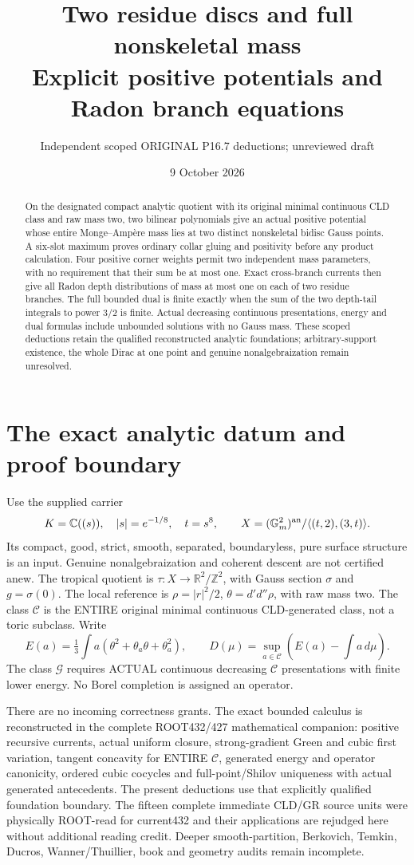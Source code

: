 \documentclass[11pt]{article}
\title{Two residue discs and full nonskeletal mass\\
Explicit positive potentials and Radon branch equations}
\author{Independent scoped ORIGINAL P16.7 deductions; unreviewed draft}
\date{9 October 2026}
\newcommand{\DD}{d'd''}
\newcommand{\C}{\mathcal C}
\newcommand{\G}{\mathcal G}
\begin{document}
\maketitle
\begin{abstract}
On the designated compact analytic quotient with its original minimal
continuous CLD class and raw mass two, two bilinear polynomials give an
actual positive potential whose entire Monge--Amp\`ere mass lies at two
distinct nonskeletal bidisc Gauss points. A six-slot maximum proves
ordinary collar gluing and positivity before any product calculation.
Four positive corner weights permit two independent mass parameters,
with no requirement that their sum be at most one. Exact cross-branch
currents then give all Radon depth distributions of mass at most one on
each of two residue branches. The full bounded dual is finite exactly
when the sum of the two depth-tail integrals to power $3/2$ is finite.
Actual decreasing continuous presentations, energy and dual formulas
include unbounded solutions with no Gauss mass. These scoped deductions
retain the qualified reconstructed analytic foundations; arbitrary-support
existence, the whole Dirac at one point and genuine nonalgebraization
remain unresolved.
\end{abstract}

\section{The exact analytic datum and proof boundary}
Use the supplied carrier
\[
 K=\mathbb C((s)),\quad |s|=e^{-1/8},\quad t=s^8,\qquad
 X=(\mathbb G_m^2)^{\rm an}/\langle(t,2),(3,t)\rangle.
\]
Its compact, good, strict, smooth, separated, boundaryless, pure surface
structure is an input. Genuine nonalgebraization and coherent descent
are not certified anew. The tropical quotient is
$\tau:X\to\mathbb R^2/\mathbb Z^2$, with Gauss section $\sigma$ and
$g=\sigma(0)$. The local reference is $\rho=|r|^2/2$,
$\theta=\DD\rho$, with raw mass two. The class $\C$ is the ENTIRE
original minimal continuous CLD-generated class, not a toric subclass.
Write
\[
 E(a)=\tfrac13\int a(\theta^2+\theta_a\theta+\theta_a^2),\qquad
 D(\mu)=\sup_{a\in\C}\left(E(a)-\int a\,d\mu\right).
\]
The class $\G$ requires ACTUAL continuous decreasing $\C$ presentations
with finite lower energy. No Borel completion is assigned an operator.

There are no incoming correctness grants. The exact bounded calculus
is reconstructed in the complete ROOT432/427 mathematical companion:
positive recursive currents, actual uniform closure, strong-gradient
Green and cubic first variation, tangent concavity for ENTIRE $\C$,
generated energy and operator canonicity, ordered cubic cocycles and
full-point/Shilov uniqueness with actual generated antecedents.
The present deductions use that explicitly qualified foundation boundary.
The fifteen complete immediate CLD/GR source units were physically
ROOT-read for current432 and their applications are rejudged here without
additional reading credit. Deeper smooth-partition, Berkovich, Temkin,
Ducros, Wanner/Thuillier, book and geometry audits remain incomplete.
\end{document}
